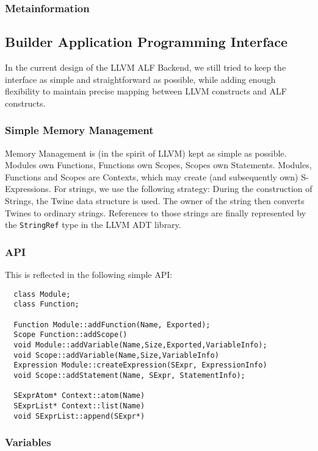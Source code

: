 \subsubsection{Metainformation}

\subsection{Builder Application Programming Interface}
In the current design of the LLVM ALF Backend, we still tried to keep
the interface as simple and straightforward as possible, while adding
enough flexibility to maintain precise mapping between LLVM constructs
and ALF constructs.

\subsubsection{Simple Memory Management}
Memory Management is (in the spirit of LLVM) kept as simple as possible. Modules
own Functions, Functions own Scopes, Scopes own Statements. Modules, Functions
and Scopes are Contexts, which may create (and subsequently own) S-Expressions.
For strings, we use the following strategy: During the construction of Strings,
the Twine data structure is used. The owner of the string then converts Twines
to ordinary strings. References to those strings are finally represented by the
\texttt{StringRef} type in the LLVM ADT library.

\subsubsection{API}
This is reflected in the following simple API:

\begin{lstlisting}
  class Module;
  class Function;

  Function Module::addFunction(Name, Exported);
  Scope Function::addScope()
  void Module::addVariable(Name,Size,Exported,VariableInfo);
  void Scope::addVariable(Name,Size,VariableInfo)
  Expression Module::createExpression(SExpr, ExpressionInfo)
  void Scope::addStatement(Name, SExpr, StatementInfo);

  SExprAtom* Context::atom(Name)
  SExprList* Context::list(Name)
  void SExprList::append(SExpr*)
\end{lstlisting}
\subsubsection{Variables}

\begin{lstlisting}
\end{lstlisting}